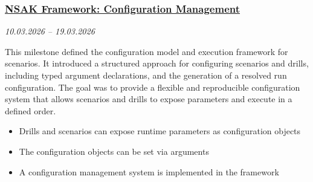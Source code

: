 \subsubsection{\href{https://gitlab.ti.bfh.ch/groups/gausf1-vonal3/-/milestones/5}{NSAK Framework: Configuration Management}}\label{subsubsec:milestone-configuration-management}
\textit{10.03.2026 -- 19.03.2026}

This milestone defined the configuration model and execution framework for  scenarios.
It introduced a structured approach for configuring scenarios and drills, including typed argument declarations, and the generation of a resolved run configuration.
The goal was to provide a flexible and reproducible configuration system that allows scenarios and drills to expose parameters and execute in a defined order.

\begin{itemize}
    \item[$\checkmark$] Drills and scenarios can expose runtime parameters as configuration objects
    \item[$\checkmark$] The configuration objects can be set via  arguments
    \item[$\checkmark$] A configuration management system is implemented in the  framework
\end{itemize}
